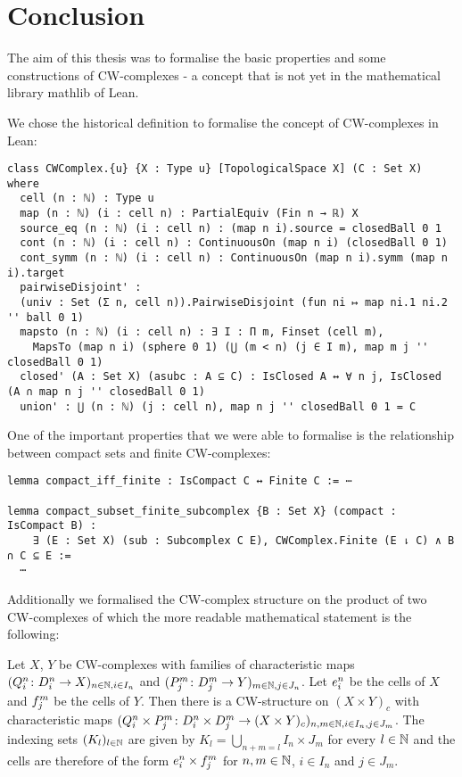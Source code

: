 \chapter*{Conclusion}

The aim of this thesis was to formalise the basic properties and some constructions of CW-complexes - a concept that is not yet in the mathematical library mathlib of Lean. 

We chose the historical definition to formalise the concept of CW-complexes in Lean: 

\begin{lstlisting}
class CWComplex.{u} {X : Type u} [TopologicalSpace X] (C : Set X) where
  cell (n : ℕ) : Type u
  map (n : ℕ) (i : cell n) : PartialEquiv (Fin n → ℝ) X
  source_eq (n : ℕ) (i : cell n) : (map n i).source = closedBall 0 1
  cont (n : ℕ) (i : cell n) : ContinuousOn (map n i) (closedBall 0 1)
  cont_symm (n : ℕ) (i : cell n) : ContinuousOn (map n i).symm (map n i).target
  pairwiseDisjoint' :
  (univ : Set (Σ n, cell n)).PairwiseDisjoint (fun ni ↦ map ni.1 ni.2 '' ball 0 1)
  mapsto (n : ℕ) (i : cell n) : ∃ I : Π m, Finset (cell m),
    MapsTo (map n i) (sphere 0 1) (⋃ (m < n) (j ∈ I m), map m j '' closedBall 0 1)
  closed' (A : Set X) (asubc : A ⊆ C) : IsClosed A ↔ ∀ n j, IsClosed (A ∩ map n j '' closedBall 0 1)
  union' : ⋃ (n : ℕ) (j : cell n), map n j '' closedBall 0 1 = C
\end{lstlisting}

One of the important properties that we were able to formalise is the relationship between compact sets and finite CW-complexes: 

\begin{lstlisting}
lemma compact_iff_finite : IsCompact C ↔ Finite C := ⋯

lemma compact_subset_finite_subcomplex {B : Set X} (compact : IsCompact B) :
    ∃ (E : Set X) (sub : Subcomplex C E), CWComplex.Finite (E ⇂ C) ∧ B ∩ C ⊆ E := 
  ⋯
\end{lstlisting}

Additionally we formalised the CW-complex structure on the product of two CW-complexes of which the more readable mathematical statement is the following: 

\begin{thm*}
    Let $X$, $Y$ be CW-complexes with families of characteristic maps $(Q_i^n \colon D_i^n \to X)_{n \in \bN, i \in I_n}$ and $(P_j^m \colon D_j^m \to Y)_{m \in \bN, j \in J_n}$. 
    Let $\openCell{n}{i}$ be the cells of $X$ and $\openCellf{m}{j}$ be the cells of $Y$.
    Then there is a CW-structure on $(X \times Y)_c$ with characteristic maps $(Q_i^n \times P_j^m \colon D_i^n \times D_j^m \to (X \times Y)_c)_{n,m \in \bN,i \in I_n,j \in J_m}$.
    The indexing sets $(K_l)_{l \in \bN}$ are given by $K_l = \bigcup_{n + m = l}I_n \times J_m$ for every $l \in \bN$ and the cells are therefore of the form $\openCell{n}{i} \times \openCellf{m}{j}$ for $n, m \in \bN$, $i \in I_n$ and $j \in J_m$.
\end{thm*}

